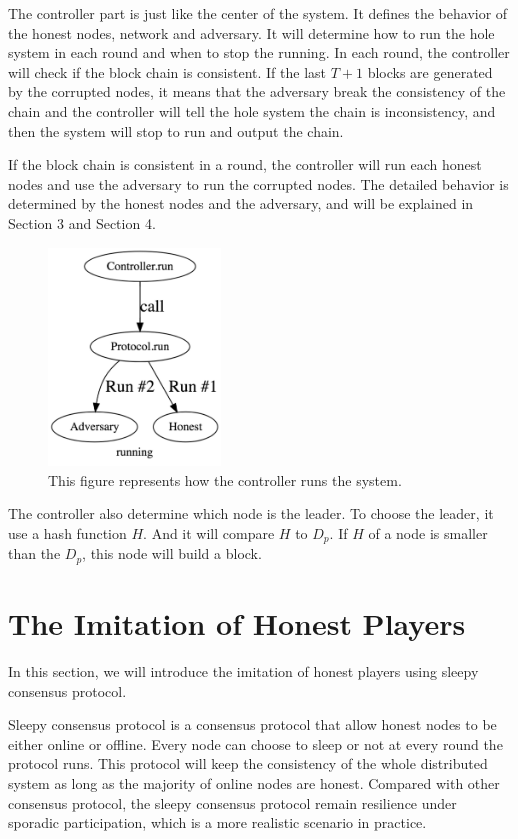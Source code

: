 \documentclass{llncs}
\begin{document}
The controller part is just like the center of the system. It defines the behavior of the honest nodes, network and adversary. It will determine how to run the hole system in each round and when to stop the running. In each round, the controller will check if the block chain is consistent. If the last $T+1$ blocks are generated by the corrupted nodes, it means that the adversary break the consistency of the chain and the controller will tell the hole system the chain is inconsistency, and then the system will stop to run and output the chain. 

If the block chain is consistent in a round, the controller will run each honest nodes and use the adversary to run the corrupted nodes. The detailed behavior is determined by the honest nodes and the adversary, and will be explained in Section 3 and Section 4. 

\vspace{-4mm}
\begin{figure}
	\centering
	\includegraphics[width=1.8in]{Figures/Running.jpg}
	\vspace{-3mm}
	\caption{This figure represents how the controller runs the system.}
\end{figure}

The controller also determine which node is the leader. To choose the leader, it use a hash function $H$. And it will compare $H$ to $D_{p}$. If $H$ of a node is smaller than the $D_{p}$, this node will build a block.  


\section{The Imitation of Honest Players}
\quad  In this section, we will introduce the imitation of honest players using sleepy consensus protocol.

Sleepy consensus protocol is a consensus protocol that allow honest nodes to be either online or offline. Every node can choose to sleep or not at every round the protocol runs. This protocol will keep the consistency of the whole distributed system as long as the majority of online nodes are honest. Compared with other consensus protocol, the sleepy consensus protocol remain resilience under sporadic participation, which is a more realistic scenario in practice.
\end{document}
